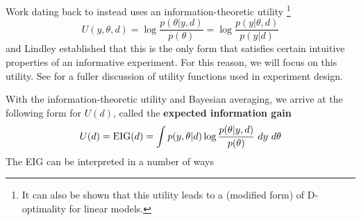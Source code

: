 Work dating back to \cite{lindley1956} instead uses an information-theoretic utility \footnote{It can also be shown \cite{chaloner1995} that this utility leads to a (modified form) of D-optimality for linear models.}
\begin{equation}
	U(y, \theta, d) = \log \frac{p(\theta | y, d)}{p(\theta)} = \log \frac{p(y | \theta, d)}{p(y|d)}
\end{equation}
and Lindley established that this is the only form that satisfies certain intuitive properties of an informative experiment. For this reason, we will focus on this utility. See \cite{ryan2015} for a fuller discussion of utility functions used in experiment design.

With the information-theoretic utility and Bayesian averaging, we arrive at the following form for $U(d)$, called the \textbf{expected information gain}
\begin{equation}
	U(d) = \text{EIG}(d) = \int p(y, \theta | d) \log\frac{p(\theta | y, d)}{p(\theta)} \ dy\ d\theta
\end{equation}
The EIG can be interpreted in a number of ways
